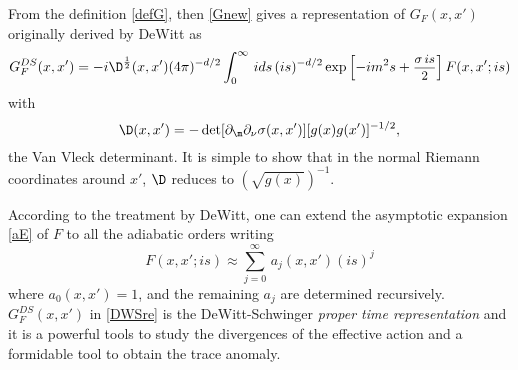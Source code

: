 \documentclass[a4paper,11pt,openright,twoside]{book}
\let\n=\nu      \let\x=\xi     \let\p=\pi      \let\r=\rho
\let\s=\sigma  \let\t=\tau     \let\u=\upsilon \let\f=\phi
\newcommand{\sdfrac}[2]{\mbox{\small$\displaystyle\frac{#1}{#2}$}}
\numberwithin{equation}{section}
\begin{document}
{{From the definition \eqref{defG}, then \eqref{Gnew} gives a representation of $G_F(x,x')$ originally derived by DeWitt as
\begin{equation}
	G_F^{DS}(x,x')=-i\D^{\frac{1}{2}}(x,x')(4\pi)^{-d/2}\int_0^\infty\,ids\,(is)^{-d/2}\exp\left[ -im^2s+\sdfrac{\s\,is}{2}\right] F(x,x';is)\label{DWSre}
\end{equation}
with 
\begin{equation}
	\D(x,x')=-\det[\partial_\m\partial_\n\s(x,x')][g(x)g(x')]^{-1/2},
\end{equation}
the Van Vleck determinant. It is simple to show that in the normal Riemann coordinates around $x'$, $\D$ reduces to $(\sqrt{g(x)})^{-1}$. {According to the treatment by DeWitt, one can extend the asymptotic expansion \eqref{aE} of $F$ to all the adiabatic orders writing
	\begin{equation}
		F(x,x';is)\approx\sum_{j=0}^\infty\,a_j(x,x')(is)^j
	\end{equation}
	where $a_0(x,x')=1$, and the remaining $a_j$ are determined recursively.  $G_F^{DS}(x,x')$ in \eqref{DWSre} is the DeWitt-Schwinger \emph{proper time representation} and it is a powerful tools to study the divergences of the effective action and a formidable tool to obtain the trace anomaly.
	
}}}
\end{document}

